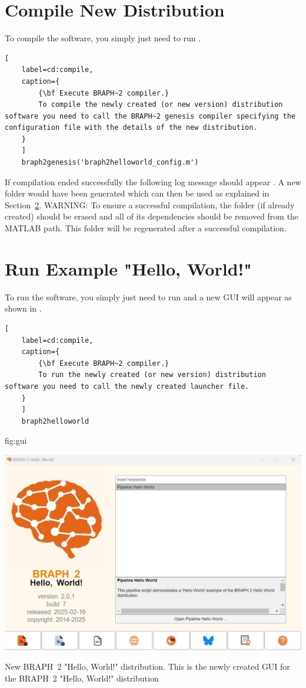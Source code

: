 \documentclass{tufte-handout}
\begin{document}
\clearpage
\section{Compile New Distribution}

To compile the software, you simply just need to run .

\begin{lstlisting}[
	label=cd:compile,
	caption={
		{\bf Execute BRAPH~2 compiler.}
		To compile the newly created (or new version) distribution software you need to call the BRAPH~2 genesis compiler specifying the configuration file with the details of the new distribution.
	}
	]
 	braph2genesis('braph2helloworld_config.m')
\end{lstlisting}

If compilation ended successfully the following log message should appear . A new  folder would have been generated which can then be used as explained in Section~\ref{sec:example}. WARNING: To ensure a successful compilation, the folder  (if already created) should be erased and all of its dependencies should be removed from the MATLAB path. This folder will be regenerated after a successful compilation.


\section{Run Example "Hello, World!"}
\label{sec:example}

To run the software, you simply just need to run  and a new GUI will appear as shown in .

\begin{lstlisting}[
	label=cd:compile,
	caption={
		{\bf Execute BRAPH~2 compiler.}
		To run the newly created (or new version) distribution software you need to call the newly created launcher file.
	}
	]
	braph2helloworld
\end{lstlisting}


{fig:gui}
{\centerline{\includegraphics{fig02.jpg}}}
{New BRAPH~2 "Hello, World!" distribution.}
{
	This is the newly created GUI for the BRAPH~2 "Hello, World!" distribution
}
\end{document}
